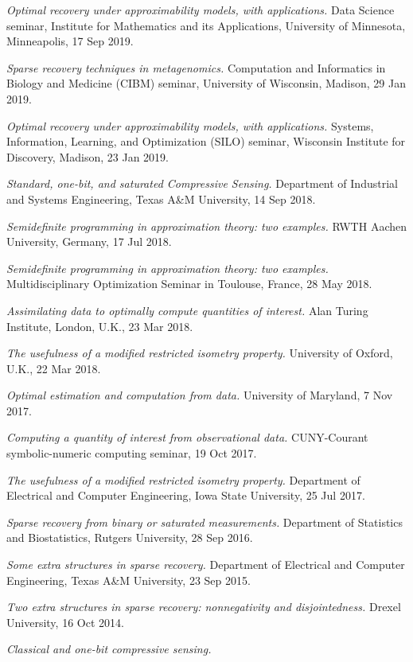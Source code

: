 \documentclass[11pt]{article}
\begin{document}
\item {\sl Optimal recovery under approximability models, with applications.}
 Data Science seminar,
 Institute for Mathematics and its Applications,
 University of Minnesota, Minneapolis, 17 Sep 2019.
\item {\sl Sparse recovery techniques in metagenomics.}
Computation and Informatics in Biology and Medicine (CIBM) seminar,
University of Wisconsin, Madison, 29 Jan 2019.
\item {\sl Optimal recovery under approximability models, with applications.}
Systems, Information, Learning, and Optimization (SILO) seminar,
Wisconsin Institute for Discovery, Madison, 23 Jan 2019.
\item {\sl Standard, one-bit, and saturated Compressive Sensing.}
Department of Industrial and Systems Engineering, Texas A\&M University, 14 Sep 2018.
\item {\sl Semidefinite programming in approximation theory: two examples.}
RWTH Aachen University, Germany, 17 Jul 2018.
\item {\sl Semidefinite programming in approximation theory: two examples.} Multidisciplinary Optimization Seminar in Toulouse, France, 28 May 2018.
\item {\sl Assimilating data to optimally compute quantities of interest.} Alan Turing Institute, London, U.K., 23 Mar 2018.
\item {\sl The usefulness of a modified restricted isometry property.} University of Oxford, U.K., 22 Mar 2018.
\item {\sl Optimal estimation and computation from data.} University of Maryland, 7 Nov 2017.
\item {\sl Computing a quantity of interest from observational data.} CUNY-Courant symbolic-numeric computing seminar, 19 Oct 2017.
\item {\sl The usefulness of a modified restricted isometry property.} Department of Electrical and Computer Engineering, Iowa State University, 25 Jul 2017.
\item {\sl Sparse recovery from binary or saturated measurements.} Department of Statistics and Biostatistics, Rutgers University, 28 Sep 2016.
\item {\sl Some extra structures in sparse recovery.} Department of Electrical and Computer Engineering, Texas A\&M University, 23 Sep 2015.
\item {\sl Two extra structures in sparse recovery: nonnegativity and disjointedness.} Drexel University, 16 Oct 2014.
\item {\sl Classical and one-bit compressive sensing.} 
\end{document}
